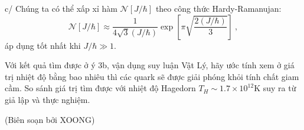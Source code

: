 \begin{enumerate}
    c/ Chúng ta có thể xấp xỉ hàm $\mathcal{N}[J/\hbar]$ theo công thức Hardy-Ramanujan:
    \begin{equation}
        \mathcal{N}[J/\hbar] \approx \frac1{4\sqrt{3}(J/\hbar)} \exp \left[ \pi \sqrt{\frac{2(J/\hbar)}{3}} \right] \ ,
    \end{equation}
    áp dụng tốt nhất khi $J/\hbar \gg 1$. %
    
    Với kết quả tìm được ở ý 3b, vận dụng suy luận Vật Lý, hãy ước tính xem ở giá trị nhiệt độ bằng bao nhiêu thì các quark sẽ được giải phóng khỏi tính chất giam cầm. So sánh giá trị tìm được với nhiệt độ Hagedorn $T_H \sim 1.7 \times 10^{12}$K suy ra từ giả lập và thực nghiệm. %
    
\end{enumerate}
    

\begin{flushright}
    (Biên soạn bởi XOONG)
\end{flushright}